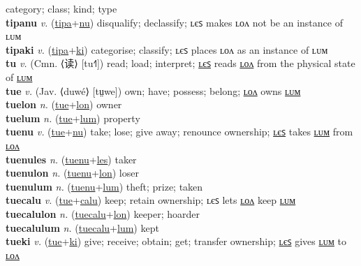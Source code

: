 category; class; kind; type \label{tipalum} \\
\textbf{tipanu} \textit{v.} (\hyperref[tipa]{tipa}+\hyperref[nu]{nu})
disqualify; declassify; ʟєꜱ makes ʟᴏᴧ not be an instance of ʟᴜᴍ \label{tipanu} \\
\textbf{tipaki} \textit{v.} (\hyperref[tipa]{tipa}+\hyperref[ki]{ki})
categorise; classify; ʟєꜱ places ʟᴏᴧ as an instance of ʟᴜᴍ \label{tipaki} \\
\textbf{tu} \textit{v.} (Cmn. ⟨读⟩ [tu˧˥])
read; load; interpret; \hyperref[tules]{ʟєꜱ} reads \hyperref[tulon]{ʟᴏᴧ} from the physical state of \hyperref[tulum]{ʟᴜᴍ} \label{tu} \\
\textbf{tue} \textit{v.} (Jav. ⟨duwé⟩ [tṳwe])
own; have; possess; belong; \hyperref[tuelon]{ʟᴏᴧ} owns \hyperref[tuelum]{ʟᴜᴍ} \label{tue} \\
\textbf{tuelon} \textit{n.} (\hyperref[tue]{tue}+\hyperref[lon]{lon})
owner \label{tuelon} \\
\textbf{tuelum} \textit{n.} (\hyperref[tue]{tue}+\hyperref[lum]{lum})
property \label{tuelum} \\
\textbf{tuenu} \textit{v.} (\hyperref[tue]{tue}+\hyperref[nu]{nu})
take; lose; give away; renounce ownership; \hyperref[tuenules]{ʟєꜱ} takes \hyperref[tuenulum]{ʟᴜᴍ} from \hyperref[tuenulon]{ʟᴏᴧ} \label{tuenu} \\
\textbf{tuenules} \textit{n.} (\hyperref[tuenu]{tuenu}+\hyperref[les]{les})
taker \label{tuenules} \\
\textbf{tuenulon} \textit{n.} (\hyperref[tuenu]{tuenu}+\hyperref[lon]{lon})
loser \label{tuenulon} \\
\textbf{tuenulum} \textit{n.} (\hyperref[tuenu]{tuenu}+\hyperref[lum]{lum})
theft; prize; taken \label{tuenulum} \\
\textbf{tuecalu} \textit{v.} (\hyperref[tue]{tue}+\hyperref[calu]{calu})
keep; retain ownership; ʟєꜱ lets \hyperref[tuecalulon]{ʟᴏᴧ} keep \hyperref[tuecalulum]{ʟᴜᴍ} \label{tuecalu} \\
\textbf{tuecalulon} \textit{n.} (\hyperref[tuecalu]{tuecalu}+\hyperref[lon]{lon})
keeper; hoarder \label{tuecalulon} \\
\textbf{tuecalulum} \textit{n.} (\hyperref[tuecalu]{tuecalu}+\hyperref[lum]{lum})
kept \label{tuecalulum} \\
\textbf{tueki} \textit{v.} (\hyperref[tue]{tue}+\hyperref[ki]{ki})
give; receive; obtain; get; transfer ownership; \hyperref[tuekiles]{ʟєꜱ} gives \hyperref[tuekilum]{ʟᴜᴍ} to \hyperref[tuekilon]{ʟᴏᴧ} \label{tueki} \\
